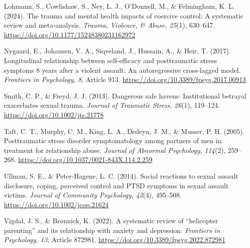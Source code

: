 \documentclass[11pt,a4paper,oneside,headinclude=true,footinclude=false]{scrartcl}
\newenvironment{apareferences}{%
  \par\begingroup\small\setlength{\leftskip}{6mm}%
  \setlength{\parindent}{-6mm}%
  \setlength{\parskip}{9pt plus 1pt minus 1pt}%
}{\par\endgroup}
\begin{document}
\begin{apareferences}
Lohmann, S., Cowlishaw, S., Ney, L. J., O'Donnell, M., \& Felmingham, K.
L. (2024). The trauma and mental health impacts of coercive control: A
systematic review and meta-analysis. \emph{Trauma, Violence, \& Abuse,
25}(1), 630--647. \url{https://doi.org/10.1177/15248380231162972}

Nygaard, E., Johansen, V. A., Siqveland, J., Hussain, A., \& Heir, T.
(2017). Longitudinal relationship between self-efficacy and
posttraumatic stress symptoms 8 years after a violent assault: An
autoregressive cross-lagged model. \emph{Frontiers in Psychology, 8},
Article 913. \url{https://doi.org/10.3389/fpsyg.2017.00913}

Smith, C. P., \& Freyd, J. J. (2013). Dangerous safe havens:
Institutional betrayal exacerbates sexual trauma. \emph{Journal of
Traumatic Stress, 26}(1), 119--124.
\url{https://doi.org/10.1002/jts.21778}

Taft, C. T., Murphy, C. M., King, L. A., Dedeyn, J. M., \& Musser, P. H.
(2005). Posttraumatic stress disorder symptomatology among partners of
men in treatment for relationship abuse. \emph{Journal of Abnormal
Psychology, 114}(2), 259--268.
\url{https://doi.org/10.1037/0021-843X.114.2.259}

Ullman, S. E., \& Peter-Hagene, L. C. (2014). Social reactions to sexual
assault disclosure, coping, perceived control and PTSD symptoms in
sexual assault victims. \emph{Journal of Community Psychology, 42}(4),
495--508. \url{https://doi.org/10.1002/jcop.21624}

Vigdal, J. S., \& Brønnick, K. (2022). A systematic review of
``helicopter parenting'' and its relationship with anxiety and
depression. \emph{Frontiers in Psychology, 13}, Article 872981.
\url{https://doi.org/10.3389/fpsyg.2022.872981}
\end{apareferences}
\end{document}
